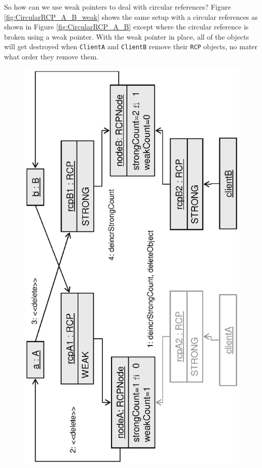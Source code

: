 \documentclass[pdf,ps2pdf,11pt]{SANDreport}
\begin{document}
So how can we use weak pointers to deal with circular references?
Figure {}\ref{fig:CircularRCP_A_B_weak} shows the same setup with a
circular references as shown in Figure {}\ref{fig:CircularRCP_A_B}
except where the circular reference is broken using a weak pointer.
With the weak pointer in place, all of the objects will get destroyed
when {}\texttt{ClientA} and {}\texttt{ClientB} remove their
{}\texttt{RCP} objects, no mater what order they remove them.

{\bsinglespace
\begin{figure}
\begin{center}
\includegraphics*[angle=270,scale=0.65]{CircularRCP_A_B_ClientA_1}

\end{center}
\end{figure}}
\end{document}
